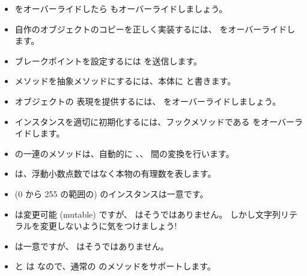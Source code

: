 \documentclass[a4paper,10pt,twoside]{book}
\begin{document}
\begin{itemize}

  \item \ct{=} をオーバーライドしたら  もオーバーライドしましょう。

  \item 自作のオブジェクトのコピーを正しく実装するには、 をオーバーライドします。

  \item ブレークポイントを設定するには  を送信します。

  \item メソッドを抽象メソッドにするには、本体に  と書きます。

  \item オブジェクトの  表現を提供するには、 をオーバーライドしましょう。

  \item インスタンスを適切に初期化するには、フックメソッドである  をオーバーライドします。

  \item {} の一連のメソッドは、自動的に 、、 間の変換を行います。

  \item {} は、浮動小数点数ではなく本物の有理数を表します。

  \item (0 から 255 の範囲の)  のインスタンスは一意です。

  \item {} は変更可能 (mutable) ですが、 はそうではありません。
  しかし文字列リテラルを変更しないように気をつけましょう!

  \item {} は一意ですが、 はそうではありません。

  \item {} と  は  なので、通常の  のメソッドをサポートします。

\end{itemize}

\ifx\wholebook\relax\else
   
   
\end{document}
